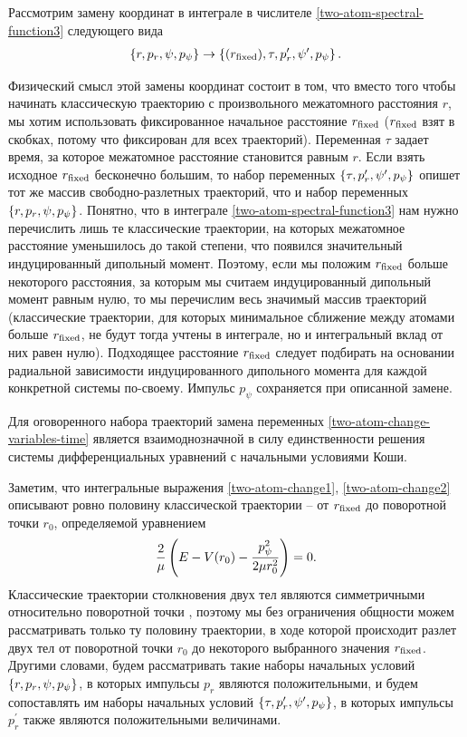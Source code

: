 Рассмотрим замену координат в интеграле в числителе \eqref{two-atom-spectral-function3} следующего вида
\begin{gather}
    \left\{ r, p_r, \psi, p_\psi \right\} \rightarrow \left\{ (r_\text{fixed}), \tau, p_r^\prime, \psi^\prime, p_\psi \right\} \label{two-atom-change-variables-time}.
\end{gather}

Физический смысл этой замены координат состоит в том, что вместо того чтобы начинать классическую траекторию с произвольного межатомного расстояния $r$, мы хотим использовать фиксированное начальное расстояние $r_\text{fixed}$ ($r_\text{fixed}$ взят в скобках, потому что фиксирован для всех траекторий). Переменная $\tau$ задает время, за которое межатомное расстояние становится равным $r$. Если взять исходное $r_\text{fixed}$ бесконечно большим, то набор переменных $\left\{ \tau, p_r^\prime, \psi^\prime, p_\psi \right\}$ опишет тот же массив свободно-разлетных траекторий, что и набор переменных $\left\{ r, p_r, \psi, p_\psi \right\}$. Понятно, что в интеграле \eqref{two-atom-spectral-function3} нам нужно перечислить лишь те классические траектории, на которых межатомное расстояние уменьшилось до такой степени, что появился значительный индуцированный дипольный момент. Поэтому, если мы положим $r_\text{fixed}$ больше некоторого расстояния, за которым мы считаем индуцированный дипольный момент равным нулю, то мы перечислим весь значимый массив траекторий (классические траектории, для которых минимальное сближение между атомами больше $r_\text{fixed}$, не будут тогда учтены в интеграле, но и интегральный вклад от них равен нулю). Подходящее расстояние $r_\text{fixed}$ следует подбирать на основании радиальной зависимости индуцированного дипольного момента для каждой конкретной системы по-своему. Импульс $p_\psi$ сохраняется при описанной замене. \par
Для оговоренного набора траекторий замена переменных \eqref{two-atom-change-variables-time} является взаимоднозначной в силу единственности решения системы дифференциальных уравнений с начальными условиями Коши. \par
Заметим, что интегральные выражения \eqref{two-atom-change1}, \eqref{two-atom-change2} описывают ровно половину классической траектории -- от $r_\text{fixed}$ до поворотной точки $r_0$, определяемой уравнением
\begin{gather}
    \frac{2}{\mu} \left( E - V(r_0) - \frac{p_\psi^2}{2 \mu r_0^2} \right) = 0.
\end{gather}
Классические траектории столкновения двух тел являются симметричными относительно поворотной точки \cite{goldstein}, поэтому мы без ограничения общности можем рассматривать только ту половину траектории, в ходе которой происходит разлет двух тел от поворотной точки $r_0$ до некоторого выбранного значения $r_\text{fixed}$. Другими словами, будем рассматривать такие наборы начальных условий $\left\{ r, p_r, \psi, p_\psi \right\}$,  в которых импульсы $p_r$ являются положительными, и будем сопоставлять им наборы начальных условий $\left\{ \tau, p_r^\prime, \psi^\prime, p_\psi \right\}$, в которых импульсы $p_r^\prime$ также являются положительными величинами. \par
